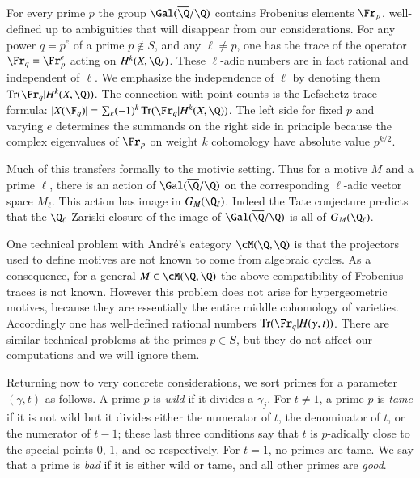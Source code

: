 \documentclass{notices}
\numberwithin{equation}{section}
\numberwithin{table}{section}
\numberwithin{figure}{section}
\DeclareMathOperator{\Tr}{Tr}
\begin{document}
{For every prime $p$ the group $\Gal(\overline{\Q}/\Q)$ 
contains Frobenius elements $\Fr_p$, well-defined up to 
ambiguities that will disappear from our considerations.  
For any power $q=p^e$ of a prime $p \not \in S$, and any $\ell \neq p$, one
has the trace of the operator $\Fr_{q} = \Fr_p^e$ acting on 
$H^k(X,\Q_\ell)$.  These $\ell$-adic 
numbers are in fact rational and independent of 
$\ell$.   We emphasize the independence of $\ell$ by denoting them $\Tr(\Fr_q|H^k(X,\Q))$.  
The connection with point counts is the Lefschetz trace formula:
$|X(\F_q)| = \sum_k (-1)^k \Tr(\Fr_q|H^k(X,\Q))$.  The
left side for fixed $p$ and varying $e$ determines the summands
on the right side in principle because the complex eigenvalues of
$\Fr_p$ on weight $k$ cohomology have absolute value 
$p^{k/2}$.

Much of this transfers formally to the motivic setting. 
Thus for a motive $M$ and a prime $\ell$, there is
an action of $\Gal(\overline{\Q}/\Q)$ on the corresponding
$\ell$-adic vector space $M_\ell$.   This action has image in 
$G_M(\Q_\ell)$.  Indeed the Tate conjecture predicts 
that the $\Q_\ell$-Zariski closure of the image of $\Gal(\overline{\Q}/\Q)$ is all of
$G_M(\Q_\ell)$. 

One technical problem with Andr\'e's category 
$\cM(\Q,\Q)$ is that the projectors used to define 
motives are not known to come from algebraic cycles.  As a consequence,
for a general $M \in \cM(\Q,\Q)$ the above compatibility of Frobenius traces
is not known.  However this problem does not arise for 
hypergeometric motives, because they are essentially
the entire middle cohomology of varieties.  Accordingly
one has well-defined rational numbers $\Tr(\Fr_q|H(\gamma,t))$. 
There are similar technical problems at the 
primes $p \in S$, but they do not affect our
computations and we will ignore them.



  Returning now to
very concrete considerations, we sort primes for a 
parameter $(\gamma,t)$ as follows.  
  A prime $p$
is {\em wild} if 
it divides a $\gamma_j$.
For $t \neq 1$, a prime $p$ is {\em tame} if 
 it
is not wild but it divides either the numerator of $t$, the denominator
of $t$, or the numerator of $t-1$; these last three conditions say that $t$ is $p$-adically close to the
special points $0$, $1$, and $\infty$ respectively.   For $t=1$,
no primes are tame.   We say that a prime is {\em bad}
if it is either wild or tame, and all other primes are {\em good}.  



}
\end{document}
